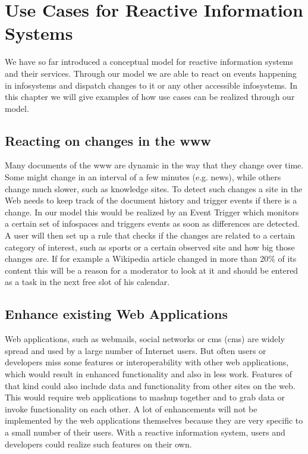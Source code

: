 

\chapter{Use Cases for Reactive Information Systems}
We have so far introduced a conceptual model for reactive information systems and their services.
Through our model we are able to react on events happening in \textrm{\glspl{infosystem}} and dispatch changes to it or any other accessible \textrm{\glspl{infosystem}}.
In this chapter we will give examples of how use cases can be realized through our model.

\section{Reacting on changes in the \gls{www}}
Many documents of the \textrm{\gls{www}} are dynamic in the way that they change over time.
Some might change in an interval of a few minutes (e.g. news), while others change much slower, such as knowledge sites.
To detect such changes a site in the Web needs to keep track of the document history and trigger events if there is a change.
In our model this would be realized by an \textrm{Event Trigger} which monitors a certain set of \textrm{\glspl{infospace}} and triggers events as soon as differences are detected.
A user will then set up a rule that checks if the changes are related to a certain category of interest, such as sports or a certain observed site and how big those changes are.
If for example a Wikipedia article changed in more than 20\% of its content this will be a reason for a moderator to look at it and should be entered as a task in the next free slot of his calendar.


\section{Enhance existing Web Applications}
Web applications, such as webmails, social networks or \textrm{\acrlong{cms} (\acrshort{cms})} are widely spread and used by a large number of Internet users.
But often users or developers miss some features or interoperability with other web applications, which would result in enhanced functionality and also in less work.
Features of that kind could also include data and functionality from other sites on the web.
This would require web applications to \textrm{\gls{mashup}} together and to grab data or invoke functionality on each other.
A lot of enhancements will not be implemented by the web applications themselves because they are very specific to a small number of their users.
With a reactive information system, users and developers could realize such features on their own.


